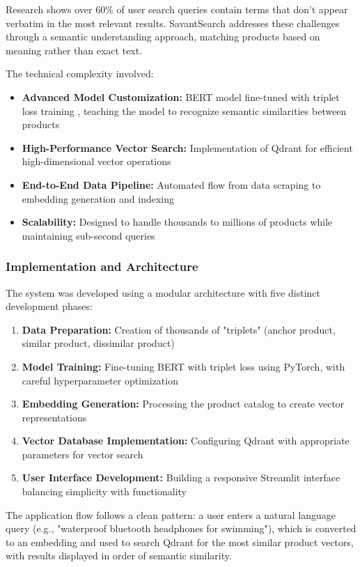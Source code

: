 \documentclass[12pt,a4paper]{article}
\begin{document}
Research shows over 60\% of user search queries contain terms that don't appear verbatim in the most relevant results. SavantSearch addresses these challenges through a semantic understanding approach, matching products based on meaning rather than exact text.

The technical complexity involved:
\begin{itemize}
    \item \textbf{Advanced Model Customization:} BERT model fine-tuned with triplet loss training \citep{liu2023}, teaching the model to recognize semantic similarities between products
    \item \textbf{High-Performance Vector Search:} Implementation of Qdrant for efficient high-dimensional vector operations
    \item \textbf{End-to-End Data Pipeline:} Automated flow from data scraping to embedding generation and indexing
    \item \textbf{Scalability:} Designed to handle thousands to millions of products while maintaining sub-second queries
\end{itemize}

\subsubsection{Implementation and Architecture}
The system was developed using a modular architecture with five distinct development phases:

\begin{enumerate}
    \item \textbf{Data Preparation:} Creation of thousands of "triplets" (anchor product, similar product, dissimilar product)
    \item \textbf{Model Training:} Fine-tuning BERT with triplet loss using PyTorch, with careful hyperparameter optimization
    \item \textbf{Embedding Generation:} Processing the product catalog to create vector representations
    \item \textbf{Vector Database Implementation:} Configuring Qdrant with appropriate parameters for vector search
    \item \textbf{User Interface Development:} Building a responsive Streamlit interface balancing simplicity with functionality
\end{enumerate}

The application flow follows a clean pattern: a user enters a natural language query (e.g., "waterproof bluetooth headphones for swimming"), which is converted to an embedding and used to search Qdrant for the most similar product vectors, with results displayed in order of semantic similarity.
\end{document}
